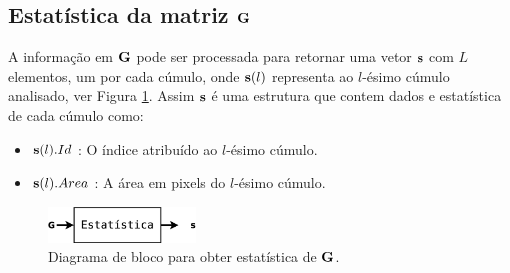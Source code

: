 \subsection{Estatística da matriz $\MATRIX{G}$ }
\label{subsec:part1}


A informação em $\MATRIX{G}$ pode ser processada para 
retornar uma vetor $\VECTOR{s}$ com $L$ elementos, um por cada cúmulo,
onde $\VECTOR{s}(l)$ representa ao $l$-ésimo cúmulo analisado,
ver Figura \ref{fig:Diagrama2}.
Assim $\VECTOR{s}$ é uma estrutura que contem 
dados e estatística de cada cúmulo como:
\begin{itemize}
\item $\VECTOR{s}(l).Id$ : O índice atribuído ao $l$-ésimo cúmulo.
\item $\VECTOR{s}(l).Area$ : A área em pixels do $l$-ésimo cúmulo.
\end{itemize}


\begin{figure}[!htb]
\centering
\includegraphics[width=0.35\textwidth]{section-cumulos/Diagrama2.eps}
\caption{Diagrama de bloco para obter estatística de $\MATRIX{G}$.}
\label{fig:Diagrama2}
\end{figure}

